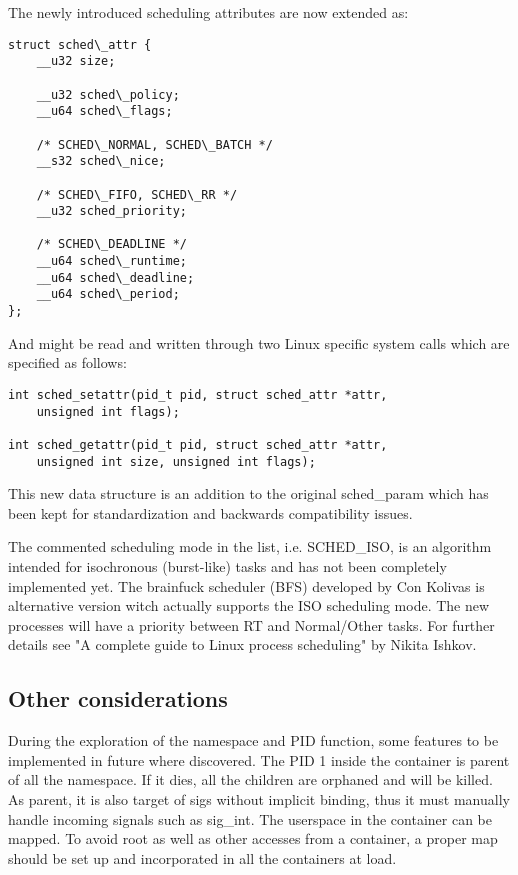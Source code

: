 \documentclass[]{scrartcl}
\begin{document}
The newly introduced scheduling attributes are now extended as:

\begin{verbatim}
struct sched\_attr {
    __u32 size;
    
    __u32 sched\_policy;
    __u64 sched\_flags;
    
    /* SCHED\_NORMAL, SCHED\_BATCH */
    __s32 sched\_nice;
    
    /* SCHED\_FIFO, SCHED\_RR */
    __u32 sched_priority;
    
    /* SCHED\_DEADLINE */
    __u64 sched\_runtime;
    __u64 sched\_deadline;
    __u64 sched\_period;
};
\end{verbatim}

And might be read and written through two Linux specific system calls which are specified as follows:


\begin{verbatim}
int sched_setattr(pid_t pid, struct sched_attr *attr,
    unsigned int flags);

int sched_getattr(pid_t pid, struct sched_attr *attr,
    unsigned int size, unsigned int flags);
\end{verbatim}

This new data structure is an addition to the original sched\_param which has been kept for standardization and backwards compatibility issues.

The commented scheduling mode in the list, i.e. SCHED\_ISO, is an algorithm intended for isochronous (burst-like) tasks and has not been completely implemented yet. 
The brainfuck scheduler (BFS) developed by Con Kolivas is alternative version witch actually supports the ISO scheduling mode. The new processes will have a priority between RT and Normal/Other tasks.
For further details see "A complete guide to Linux process scheduling"  by Nikita Ishkov.

\subsection{Other considerations}

During the exploration of the namespace and PID function, some features to be implemented in future where discovered. 
The PID 1 inside the container is parent of all the namespace. If it dies, all the children are orphaned and will be killed. As parent, it is also target of sigs without implicit binding, thus it must manually handle incoming signals such as sig\_int.
The userspace in the container can be mapped. To avoid root as well as other accesses from a container, a proper map should be set up and incorporated in all the containers at load.
\end{document}
